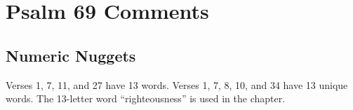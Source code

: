 \section{Psalm 69 Comments}

\subsection{Numeric Nuggets}
Verses 1, 7, 11, and 27 have 13 words. Verses 1, 7, 8, 10, and 34 have 13 unique words. The 13-letter word ``righteousness'' is used in the chapter.
